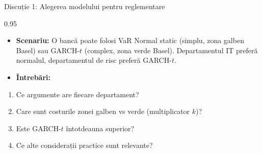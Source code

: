 \documentclass[9pt, aspectratio=169, t]{beamer}
\begin{document}
\begin{frame}{Discuție 1: Alegerea modelului pentru reglementare}
    \begin{cminipage}{0.95\textwidth}
    \begin{itemize}\setlength{\itemsep}{0pt}
        \item \textbf{Scenariu:} O bancă poate folosi VaR Normal static (simplu, zona galben Basel) sau GARCH-$t$ (complex, zona verde Basel). Departamentul IT preferă normalul, departamentul de risc preferă GARCH-$t$.
    \end{itemize}

    \vspace{0.3cm}
    \begin{itemize}\setlength{\itemsep}{0pt}
        \item \textbf{Întrebări:}
    \end{itemize}
    \begin{enumerate}\setlength{\itemsep}{0pt}
        \item Ce argumente are fiecare departament?
        \item Care sunt costurile zonei galben vs verde (multiplicator $k$)?
        \item Este GARCH-$t$ întotdeauna superior?
        \item Ce alte considerații practice sunt relevante?
    \end{enumerate}
    \end{cminipage}
\end{frame}
\end{document}
